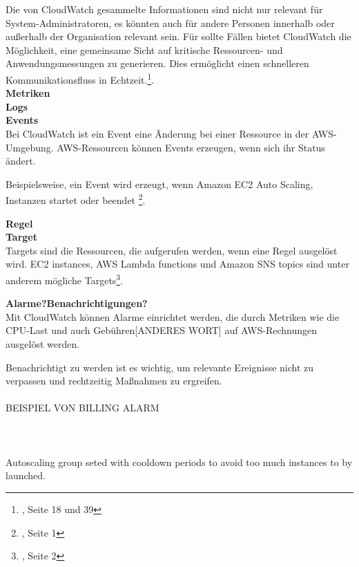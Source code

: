 Die von CloudWatch gesammelte Informationen sind nicht nur relevant für System-Administratoren, es könnten auch für andere Personen innerhalb oder außerhalb der Organisation relevant sein.
Für sollte Fällen bietet CloudWatch die Möglichkeit, eine gemeinsame Sicht auf kritische Ressourcen- und Anwendungsmessungen zu generieren. 
Dies ermöglicht einen schnelleren Kommunikationsfluss in Echtzeit.\footnote{\cite{AMZ14}, Seite 18 und 39}. 
\\

\textbf{Metriken} \\

\textbf{Logs} \\
\textbf{Events} \\
Bei CloudWatch ist ein Event eine Änderung bei einer Ressource in der AWS-Umgebung. 
AWS-Ressourcen können Events erzeugen, wenn sich ihr Status ändert. 

Beispielsweise, ein Event wird erzeugt, wenn Amazon EC2 Auto Scaling, Instanzen startet oder beendet \footnote{\cite{AMZ13}, Seite 1}. 

\textbf{Regel} \\

\textbf{Target} \\
Targets sind die Ressourcen, die aufgerufen werden, wenn eine Regel ausgelöst wird.
EC2 instances, AWS Lambda functions und Amazon SNS topics sind unter anderem mögliche Targets\footnote{\cite{AMZ13}, Seite 2}.

\textbf{Alarme?Benachrichtigungen?}\\
Mit CloudWatch können Alarme einrichtet werden, die durch Metriken wie die CPU-Last und auch Gebühren[ANDERES WORT] auf AWS-Rechnungen ausgelöst werden.

Benachrichtigt zu werden ist es wichtig, um relevante Ereignisse nicht zu verpassen und rechtzeitig Maßnahmen zu ergreifen.
\\\\
BEISPIEL VON BILLING ALARM
\\\\
\\\\
Autoscaling group seted with cooldown periods to avoid too much instances to by launched.

